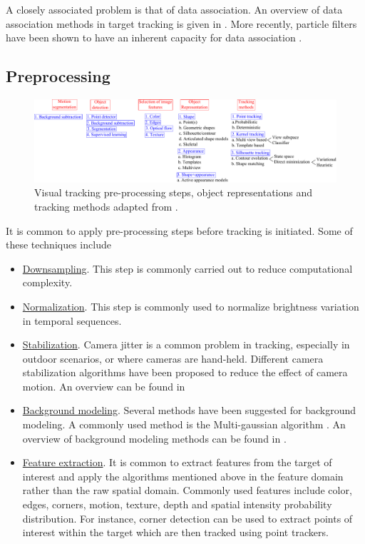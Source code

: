 A closely associated problem is that of data association.  An overview of data association methods in target tracking is given in \cite{1993_JNL_SURVEYcorresp_Cox}.  More recently, particle filters have been shown to have an inherent capacity for data association \cite{1998_JNL_Condensation_IsardBlake}.   

\subsection{Preprocessing}
\begin{figure}[t]
	\center
	\includegraphics[width=1.15\textwidth]{thesis/TRK_overview.pdf}
	\caption{Visual tracking pre-processing steps, object representations and tracking methods adapted from \cite{2006_JNL_SURVEYtrk_Yilmaz}.}
	\label{TRK_overviewDiagram}
\end{figure}


It is common to apply pre-processing steps before tracking is initiated.  Some of these techniques include 

\begin{itemize}
\item \underline{Downsampling}.  This step is commonly carried out to reduce computational complexity.
\item \underline{Normalization}.  This step is commonly used to normalize brightness variation in temporal sequences.
\item \underline{Stabilization}.  Camera jitter is a common problem in tracking, especially in outdoor scenarios, or where cameras are hand-held.  Different camera stabilization algorithms have been proposed to reduce the effect of camera motion.  An overview can be found in \cite{2006_WHITE_stab_Sachs, 1999_JNL_stab_Engelsberg}
\item \underline{Background modeling}.  Several methods have been suggested for background modeling.  A commonly used method is the Multi-gaussian algorithm \cite{1999_CNF_RealTimeTracking_Stauffer}.  An overview of background modeling methods can be found in \cite{1999_CNF_Wallflower_Toyama}.
\item \underline{Feature extraction}.  It is common to extract features from the target of interest and apply the algorithms mentioned above in the feature domain rather than the raw spatial domain.  Commonly used features include color, edges, corners, motion, texture, depth and spatial intensity probability distribution.  For instance, corner detection \cite{1988_CNF_CombinedCornerEdgeDetector_Harris,2004_JNL_SIFT_Mikolajczyk} can be used to extract points of interest within the target which are then tracked using point trackers. 
\end{itemize}

